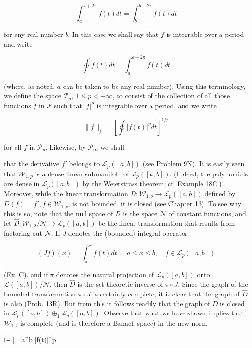$$\int_a^{a+2\pi} f(t)dt = \int_b^{b+2\pi} f(t)dt$$

for any real number $b$. In this case we shall say that $f$ is integrable over a period and write

$$\oint f(t)dt = \int_a^{a+2\pi} f(t)dt$$

(where, as noted, $a$ can be taken to be any real number). Using this terminology, we define the space $\mathcal{P}_p$, $1 \leq p < +\infty$, to consist of the collection of all those functions $f$ in $\mathcal{P}$ such that $|f|^p$ is integrable over a period, and we write

$$\|f\|_p = \left[ \oint |f(t)|^p dt \right]^{1/p}$$

for all $f$ in $\mathcal{P}_p$. Likewise, by $\mathcal{P}_\infty$ we shall

that the derivative $f'$ belongs to $\mathcal{L}_p([a, b])$ (see Problem 9N). It is easily seen that $\mathcal{W}_{1,p}$ is a dense linear submanifold of $\mathcal{L}_p([a, b])$. (Indeed, the polynomials are dense in $\mathcal{L}_p([a, b])$ by the Weierstrass theorem; cf. Example 18C.) Moreover, while the linear transformation $D: \mathcal{W}_{1,p} \rightarrow \mathcal{L}_p([a, b])$ defined by $D(f) = f', f \in \mathcal{W}_{1,p}$, is not bounded, it is closed (see Chapter 13). To see why this is so, note that the null space of $D$ is the space $\mathcal{N}$ of constant functions, and let $\hat{D}: \mathcal{W}_{1,2}/\mathcal{N} \rightarrow \mathcal{L}_p([a, b])$ be the linear transformation that results from factoring out $\mathcal{N}$. If $J$ denotes the (bounded) integral operator

$$(Jf)(x) = \int_a^x f(t)dt, \quad a \leq x \leq b, \quad f \in \mathcal{L}_p([a, b])$$

(Ex. C), and if $\pi$ denotes the natural projection of $\mathcal{L}_p([a, b])$ onto $\mathcal{L}([a, b])/\mathcal{N}$, then $\hat{D}$ is the set-theoretic inverse of $\pi \circ J$. Since the graph of the bounded transformation $\pi \circ J$ is certainly complete, it is clear that the graph of $\hat{D}$ is also (Prob. 13R). But from this it follows readily that the graph of $D$ is closed in $\mathcal{L}_p([a, b]) \oplus_1 \mathcal{L}_p([a, b])$. Observe that what we have shown implies that $\mathcal{W}_{1,2}$ is complete (and is therefore a Banach space) in the new norm

$$\|f\| = \left[ \int_a^b |f(t)|^p
